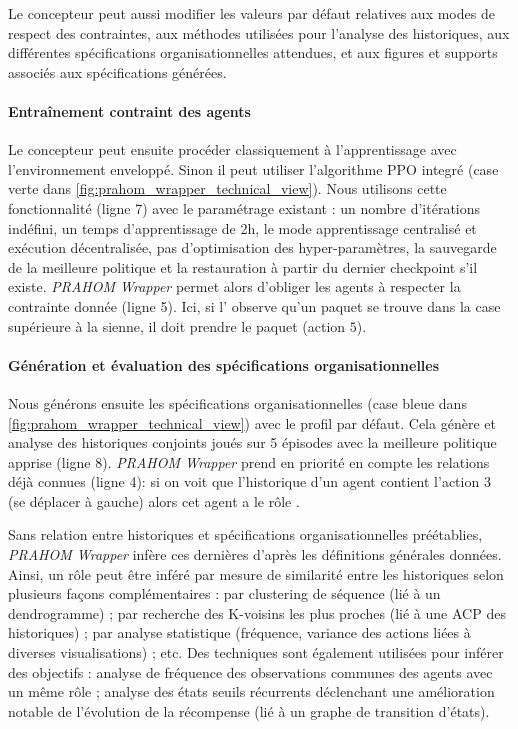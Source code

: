 \documentclass[demonstration]{jfsma}
\newcounter{relation}
\begin{document}
Le concepteur peut aussi modifier les valeurs par défaut relatives aux modes de respect des contraintes, aux méthodes utilisées pour l'analyse des historiques, aux différentes spécifications organisationnelles attendues, et aux figures et supports associés aux spécifications générées.

\paragraph{Entraînement contraint des agents}

Le concepteur peut ensuite procéder classiquement à l'apprentissage avec l'environnement enveloppé. Sinon il peut utiliser l'algorithme PPO integré (case verte dans \autoref{fig:prahom_wrapper_technical_view}). Nous utilisons cette fonctionnalité (ligne 7) avec le paramétrage existant  : un nombre d'itérations indéfini, un temps d'apprentissage de 2h, le mode apprentissage centralisé et exécution décentralisée, pas d'optimisation des hyper-paramètres, la sauvegarde de la meilleure politique et la restauration à partir du dernier checkpoint s'il existe.
\emph{PRAHOM Wrapper} permet alors d'obliger les agents à respecter la contrainte donnée (ligne 5). Ici, si l' observe qu'un paquet se trouve dans la case supérieure à la sienne, il doit prendre le paquet (action $5$).

\paragraph{Génération et évaluation des spécifications organisationnelles }

Nous générons ensuite les spécifications organisationnelles (case bleue dans \autoref{fig:prahom_wrapper_technical_view}) avec le profil par défaut. Cela génère et analyse des historiques conjoints joués sur 5 épisodes avec la meilleure politique apprise (ligne 8).
\emph{PRAHOM Wrapper} prend en priorité en compte les relations déjà connues (ligne 4): si on voit que l'historique d'un agent contient l'action $3$ (se déplacer à gauche) alors cet agent a le rôle .

Sans relation entre historiques et spécifications organisationnelles préétablies, \emph{PRAHOM Wrapper} infère ces dernières d'après les définitions générales données. Ainsi, un rôle peut être inféré par mesure de similarité entre les historiques selon plusieurs façons complémentaires : par clustering de séquence (lié à un dendrogramme) ; par recherche des K-voisins les plus proches (lié à une ACP des historiques) ; par analyse statistique (fréquence, variance des actions liées à diverses visualisations) ; etc.
Des techniques sont également utilisées pour inférer des objectifs : analyse de fréquence des observations communes des agents avec un même rôle ; analyse des états seuils récurrents déclenchant une amélioration notable de l'évolution de la récompense (lié à un graphe de transition d'états).
\end{document}
